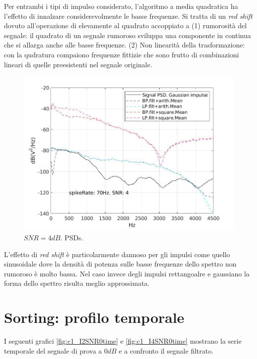 \documentclass[9pt,twocolumn,twoside]{osajnl}
\begin{document}
Per entrambi i tipi di impulso considerato, l'algoritmo a media quadratica ha l'effetto di innalzare considerevolmente le basse frequenze. Si tratta di un {\it red shift} dovuto all'operazione di elevamente al quadrato accoppiato a (1) rumorosità del segnale: il quadrato di un segnale rumoroso sviluppa una componente in continua che si allarga anche alle basse frequenze. (2) Non linearità della trasformazione: con la qudratura compaiono frequenze fittizie che sono frutto di combinazioni lineari di quelle preesistenti nel segnale originale.

\begin{figure}[htbp]
\centering
\includegraphics[width=1\linewidth]{results/c9_I2SNR4spec.jpg}
\caption{$SNR = 4dB$. PSDs.}
\label{fig:c9_I2SNR4spec}
\end{figure}

L'effetto di {\it red shift} è particolarmente dannoso per gli impulsi come quello sinusoidale dove la densità di potenza sulle basse frequenze dello spettro non rumoroso è molto bassa. Nel caso invece degli impulsi rettangoalre e gaussiano la forma dello spettro risulta meglio approssimata.




\section{Sorting: profilo temporale}

I seguenti grafici \ref{fig:c1_I2SNR0time} e \ref{fig:c1_I4SNR0time} mostrano la serie temporale del segnale di prova a $0dB$ e a confronto il segnale filtrato.
\end{document}
